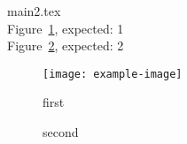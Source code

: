 \documentclass{article}
\begin{document}
{main2.tex}\\
Figure~\ref{fig:first}, expected: 1\\
Figure~\ref{fig:second}, expected: 2\\

\begin{figure}
	\texttt{[image: example-image]}
	\caption{first}
	\label{fig:first}
\end{figure}

\begin{figure}
	
	\caption{second}
	\label{fig:second}
\end{figure}
\end{document}
